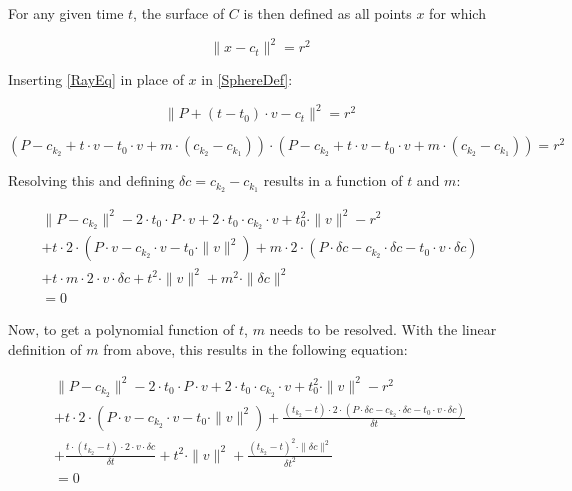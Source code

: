 For any given time \(t\), the surface of \(C\) is then defined as all points \(x\) for which

\begin{equation}\label{SphereDef}
    \|x-c_t\|^2 = r^2
\end{equation}

Inserting \eqref{RayEq} in place of \(x\) in \eqref{SphereDef}:

\begin{equation}
    \|P + (t - t_0) \cdot v - c_t\|^2 = r^2
\end{equation}

\begin{equation*}
    (P - c_{k_2} + t \cdot v - t_0 \cdot v + m \cdot (c_{k_2} - c_{k_1})) \cdot (P - c_{k_2} + t \cdot v - t_0 \cdot v + m \cdot (c_{k_2} - c_{k_1})) = r^2
\end{equation*}

Resolving this and defining \(\delta c = c_{k_2} - c_{k_1}\) results in a function of \(t\) and \(m\):

\begin{equation}\label{SphereBeforeM}
    \begin{split}
        \|P - c_{k_2}\|^2
        - 2 \cdot t_0 \cdot P \cdot v
        + 2 \cdot t_0 \cdot c_{k_2} \cdot v
        + t_0^2 \cdot \|v\|^2
        - r^2
        \\
        + t \cdot 2 \cdot (P \cdot v - c_{k_2} \cdot v - t_0 \cdot \|v\|^2)
        + m \cdot 2 \cdot (P \cdot \delta c - c_{k_2} \cdot \delta c - t_0 \cdot v \cdot \delta c)
        \\
        + t \cdot m \cdot 2 \cdot v \cdot \delta c
        + t^2 \cdot \|v\|^2
        + m^2 \cdot \|\delta c\|^2
        \\
        = 0
    \end{split}
\end{equation}

Now, to get a polynomial function of \(t\), \(m\) needs to be resolved.
With the linear definition of \(m\) from above, this results in the following equation:

\begin{equation*}
    \begin{split}
        \|P - c_{k_2}\|^2
        - 2 \cdot t_0 \cdot P \cdot v
        + 2 \cdot t_0 \cdot c_{k_2} \cdot v
        + t_0^2 \cdot \|v\|^2
        - r^2
        \\
        + t \cdot 2 \cdot (P \cdot v - c_{k_2} \cdot v - t_0 \cdot \|v\|^2)
        + \frac{(t_{k_2} - t) \cdot
            2 \cdot (P \cdot \delta c - c_{k_2} \cdot \delta c - t_0 \cdot v \cdot \delta c)
        }{\delta t}
        \\
        + \frac{t \cdot (t_{k_2} - t) \cdot 2 \cdot v \cdot \delta c}{\delta t}
        + t^2 \cdot \|v\|^2
        + \frac{(t_{k_2} - t)^2 \cdot \|\delta c\|^2}{\delta t^2}
        \\
        = 0
    \end{split}
\end{equation*}

